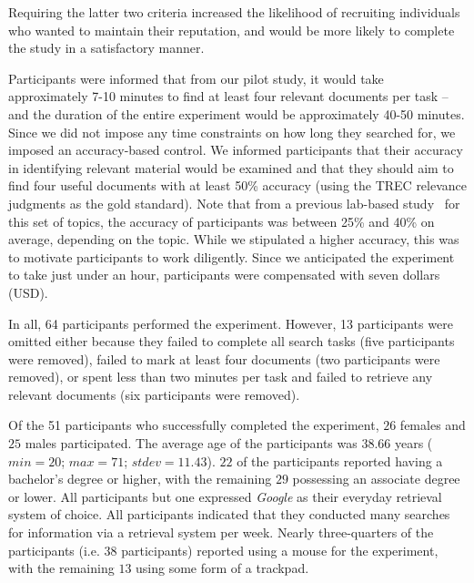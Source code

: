 Requiring the latter two criteria increased the likelihood of recruiting individuals who wanted to maintain their reputation, and would be more likely to complete the study in a satisfactory manner. 

Participants were informed that from our pilot study, it would take approximately 7-10 minutes to find at least four relevant documents per task -- and the duration of the entire experiment would be approximately 40-50 minutes. Since we did not impose any time constraints on how long they searched for, we imposed an accuracy-based control. We informed participants that their accuracy in identifying relevant material would be examined and that they should aim to find four useful documents with at least 50\% accuracy (using the TREC relevance judgments as the gold standard). Note that from a previous lab-based study~\cite{maxwell2017snippet_length} for this set of topics, the accuracy of participants was between 25\% and 40\% on average, depending on the topic. While we stipulated a higher accuracy, this was to motivate participants to work diligently. Since we anticipated the experiment to take just under an hour, participants were compensated with seven dollars (USD).

In all, 64 participants performed the experiment. However, 13 participants were omitted either because they failed to complete all search tasks (five participants were removed), failed to mark at least four documents (two participants were removed), or spent less than two minutes per task and failed to retrieve any relevant documents (six participants were removed). 

Of the 51 participants who successfully completed the experiment, $26$ females and $25$ males participated. The average age of the participants was $38.66$ years ($min=20$; $max=71$; $stdev=11.43$). $22$ of the participants reported having a bachelor's degree or higher, with the remaining $29$ possessing an associate degree or lower. All participants but one expressed \emph{Google} as their everyday retrieval system of choice. All participants indicated that they conducted many searches for information via a retrieval system per week. Nearly three-quarters of the participants (i.e. 38 participants) reported using a mouse for the experiment, with the remaining $13$ using some form of a trackpad.

